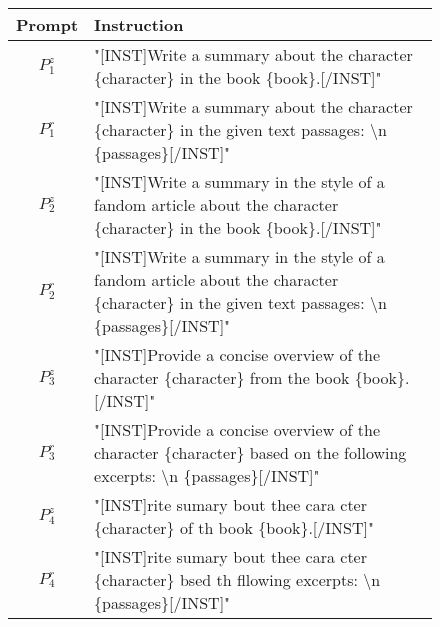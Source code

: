 \begin{figure}
    \begin{center}
        \begin{tabular}{|c|m{10cm}|}
            \hline
            Prompt      & Instruction                                                                                                                                                 \\ [0.5ex]
            \hline\hline
            $P_{1}^{z}$ & "[INST]Write a summary about the character \{character\} in the book \{book\}.[/INST]"                                                                      \\
            \hline
            $P_{1}^{r}$ & "[INST]Write a summary about the character \{character\} in the given text passages: \textbackslash n \{passages\}[/INST]"                                  \\
            \hline\hline
            $P_{2}^{z}$ & "[INST]Write a summary in the style of a fandom article about the character \{character\} in the book \{book\}.[/INST]"                                     \\
            \hline
            $P_{2}^{r}$ & "[INST]Write a summary in the style of a fandom article about the character \{character\} in the given text passages: \textbackslash n \{passages\}[/INST]" \\
            \hline\hline
            $P_{3}^{z}$ & "[INST]Provide a concise overview of the character \{character\} from the book \{book\}.[/INST]"                                                            \\
            \hline
            $P_{3}^{r}$ & "[INST]Provide a concise overview of the character \{character\} based on the following excerpts: \textbackslash n \{passages\}[/INST]"                     \\
            \hline\hline
            $P_{4}^{z}$ & "[INST]rite sumary bout thee cara cter \{character\} of th book \{book\}.[/INST]"                                                                           \\
            \hline
            $P_{4}^{r}$ & "[INST]rite sumary bout thee cara cter \{character\} bsed th fllowing excerpts: \textbackslash n \{passages\}[/INST]"                                       \\ [1ex]
            \hline
        \end{tabular}
    \end{center}
    \label{fig:prompts2}
\end{figure}





